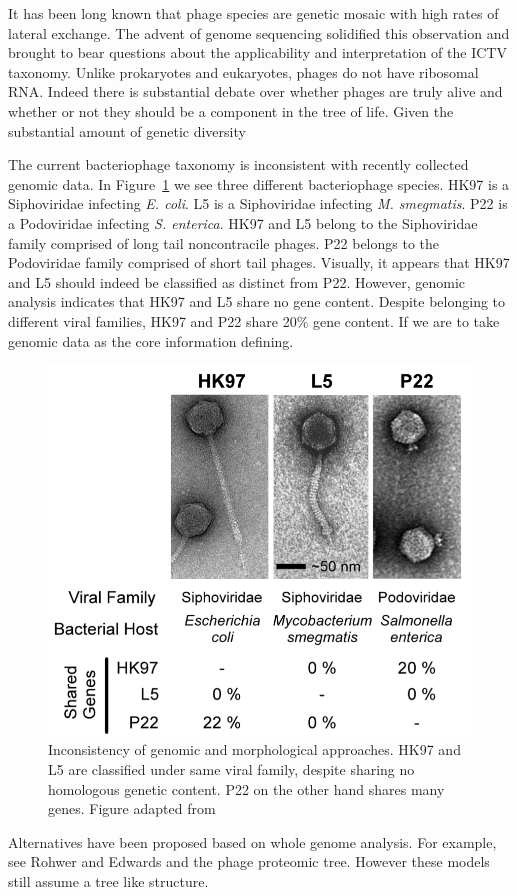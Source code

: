 It has been long known that phage species are genetic mosaic with high rates of lateral exchange.
The advent of genome sequencing solidified this observation and brought to bear questions about the applicability and interpretation of the ICTV taxonomy.
Unlike prokaryotes and eukaryotes, phages do not have ribosomal RNA.
Indeed there is substantial debate over whether phages are truly alive and whether or not they should be a component in the tree of life.
Given the substantial amount of genetic diversity 

The current bacteriophage taxonomy is inconsistent with recently collected genomic data.
In Figure~\ref{phage:fig:inconsistency} we see three different bacteriophage species.
HK97 is a Siphoviridae infecting \emph{E. coli}.
L5 is a Siphoviridae infecting \emph{M. smegmatis}.
P22 is a Podoviridae infecting \emph{S. enterica}.
HK97 and L5 belong to the Siphoviridae family comprised of long tail noncontracile phages.
P22 belongs to the Podoviridae family comprised of short tail phages.
Visually, it appears that HK97 and L5 should indeed be classified as distinct from P22.
However, genomic analysis indicates that HK97 and L5 share no gene content.
Despite belonging to different viral families, HK97 and P22 share 20\% gene content.
If we are to take genomic data as the core information defining.

\begin{figure}
\centering
\includegraphics[width=.5\linewidth]{./fig/LAWRENCE_phage_comparative.png}
\caption[Inconsistency of morphological classification in bacteriophage.]{Inconsistency of genomic and morphological approaches. HK97 and L5 are classified under same viral family, despite sharing no homologous genetic content. P22 on the other hand shares many genes. Figure adapted from \parencite{Lawrence:2002eg}}
\label{phage:fig:inconsistency}
\end{figure}

Alternatives have been proposed based on whole genome analysis.
For example, see Rohwer and Edwards and the phage proteomic tree.
However these models still assume a tree like structure.


